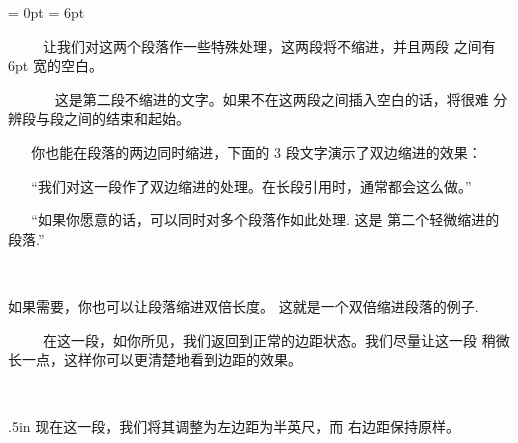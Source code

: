 {\parindent = 0pt \parskip = 6pt
~%

~%
~%
~%
让我们对这两个段落作一些特殊处理，这两段将不缩进，并且两段
之间有 6pt 宽的空白。

~%
~%
~%
~%
这是第二段不缩进的文字。如果不在这两段之间插入空白的话，将很难
分辨段与段之间的结束和起始。

\par %
}%

~%
~%
你也能在段落的两边同时缩进，下面的 3 段文字演示了双边缩进的效果：

\smallskip %
{\narrower
~%
~%
``我们对这一段作了双边缩进的处理。在长段引用时，通常都会这么做。''

~%
~%
``如果你愿意的话，可以同时对多个段落作如此处理.  这是
第二个轻微缩进的段落.''\par}

~%
~%
~%
{\narrower \narrower 如果需要，你也可以让段落缩进双倍长度。
这就是一个双倍缩进段落的例子.\par}
\vskip 1pc %
~%
~%
~%
在这一段，如你所见，我们返回到正常的边距状态。我们尽量让这一段
稍微长一点，这样你可以更清楚地看到边距的效果。

~%
~%
{\leftskip .5in 现在这一段，我们将其调整为左边距为半英尺，而
右边距保持原样。\par}

